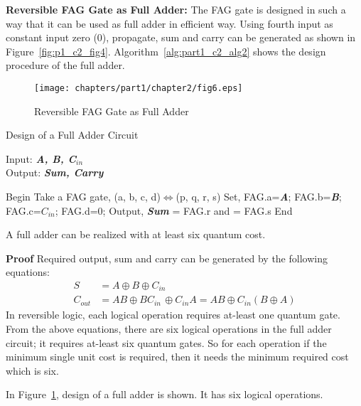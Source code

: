 \noindent\textbf{Reversible FAG Gate as Full Adder:} The FAG gate is designed in such a way that it can be used as full adder in efficient way. Using fourth input as constant input zero (0), propagate, sum and carry can be generated as shown in Figure~\ref{fig:p1_c2_fig4}. Algorithm~\ref{alg:part1_c2_alg2} shows the design procedure of the full adder.
\begin{figure}[!tbh]
	\centering
	\texttt{[image: chapters/part1/chapter2/fig6.eps]}
	\caption{Reversible FAG Gate as Full Adder}
	\label{fig:p1_c2_fig6}
\end{figure}
\begin{algorithm}[H]
	\caption{Design of a Full Adder Circuit}
	Input: {\bf {\it A, B, C${}_{in}$}}\\
	Output: {\bf {\it Sum, Carry}}
	\label{alg:part1_c2_alg2}
	
	\begin{algorithmic}[1]
		
		\STATE Begin
		\STATE Take a FAG gate, (a, b, c, d)$\Leftrightarrow$(p, q, r, s)
		\STATE Set, FAG.a={\bf {\it A}}; FAG.b={\bf {\it B}}; \STATE FAG.c={\bf {\it $C_{in}$}}; FAG.d=0;
		\STATE Output, {\bf {\it Sum}} = FAG.r and 
		 = FAG.s{\bf }
		\STATE End
	\end{algorithmic}
\end{algorithm}
\begin{property}\textnormal{
		A full adder can be realized with at least six quantum cost.}
\end{property}

\noindent\textbf{Proof}  Required output, sum and carry can be generated by the following equations:
\begin{align*}
S &= A \oplus  B \oplus  C{}_{in}\\
C{}_{out} &= AB \oplus  BC{}_{in\ }\oplus  C{}_{in}A = AB \oplus  C{}_{in}(B\oplus  A)
\end{align*}\textnormal{
	In reversible logic, each logical operation requires at-least one quantum gate. From the above equations, there are six logical operations in the full adder circuit; it requires at-least six quantum gates. So for each operation if the minimum single unit cost is required, then it needs the minimum required cost which is six.}

\begin{example}\textnormal{
		In Figure~\ref{fig:p1_c2_fig6}, design of a full adder is shown. It has six logical operations.}%
\end{example}
